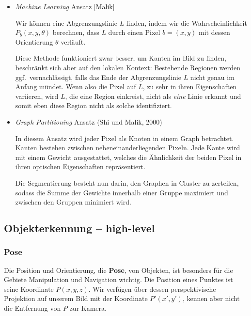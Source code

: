 \begin{itemize}
\item \textit{Machine Learning} Ansatz [Malik]

Wir können eine Abgrenzungslinie $L$ finden, indem wir die Wahrscheinlichkeit $P_b(x,y,\theta)$ berechnen, dass $L$ durch einen Pixel $b=(x,y)$ mit dessen Orientierung $\theta$ verläuft.

Diese Methode funktioniert zwar besser, um Kanten im Bild zu finden, beschränkt sich aber auf den lokalen Kontext: Bestehende Regionen werden ggf.\ vernachlässigt, falls das Ende der Abgrenzungslinie $L$ nicht genau im Anfang mündet. Wenn also die Pixel auf $L$, zu sehr in ihren Eigenschaften variieren, wird $L$, die eine Region einkreist, nicht als \textit{eine} Linie erkannt und somit eben diese Region nicht als solche identifiziert.

\item \textit{Graph Partitioning} Ansatz (Shi und Malik, 2000)

In diesem Ansatz wird jeder Pixel als Knoten in einem Graph betrachtet. Kanten bestehen zwischen nebeneinanderliegenden Pixeln. Jede Kante wird mit einem Gewicht ausgestattet, welches die Ähnlichkeit der beiden Pixel in ihren optischen Eigenschaften repräsentiert.

Die Segmentierung besteht nun darin, den Graphen in Cluster zu zerteilen, sodass die Summe der Gewichte innerhalb einer Gruppe maximiert und zwischen den Gruppen minimiert wird.


\end{itemize}

\subsection{Objekterkennung -- \glqq high-level\grqq}

\subsubsection{Pose}

Die Position und Orientierung, die \textbf{Pose}, von Objekten, ist besonders für die Gebiete Manipulation und Navigation wichtig. Die Position eines Punktes ist seine Koordinate $P(x,y,z)$. Wir verfügen über dessen perspektivische Projektion auf unserem Bild mit der Koordinate $P'(x',y')$,
kennen aber nicht die Entfernung von $P$ zur Kamera.

